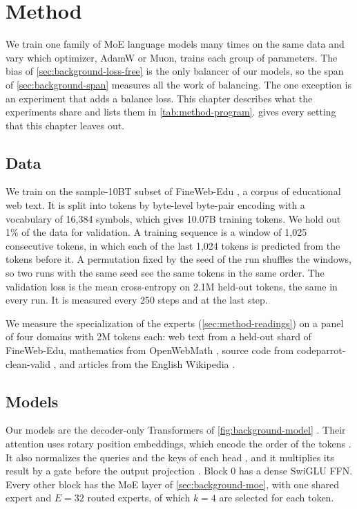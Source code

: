 \chapter{Method}
\label{sec:method}

We train one family of MoE language models many times on the same data and vary which optimizer, AdamW or Muon, trains each group of parameters. The bias of \cref{sec:background-loss-free} is the only balancer of our models, so the span of \cref{sec:background-span} measures all the work of balancing. The one exception is an experiment that adds a balance loss. This chapter describes what the experiments share and lists them in \cref{tab:method-program}.  gives every setting that this chapter leaves out.

\section{Data}
\label{sec:method-data}
We train on the sample-10BT subset of FineWeb-Edu \cite{penedo2024fineweb}, a corpus of educational web text. It is split into tokens by byte-level byte-pair encoding \cite{radford2019language} with a vocabulary of 16,384 symbols, which gives 10.07B training tokens. We hold out 1\% of the data for validation. A training sequence is a window of 1,025 consecutive tokens, in which each of the last 1,024 tokens is predicted from the tokens before it. A permutation fixed by the seed of the run shuffles the windows, so two runs with the same seed see the same tokens in the same order. The validation loss is the mean cross-entropy on 2.1M held-out tokens, the same in every run. It is measured every 250 steps and at the last step.

We measure the specialization of the experts (\cref{sec:method-readings}) on a panel of four domains with 2M tokens each: web text from a held-out shard of FineWeb-Edu, mathematics from OpenWebMath \cite{paster2024openwebmath}, source code from codeparrot-clean-valid \cite{codeparrot2022clean}, and articles from the English Wikipedia \cite{wikimedia2023wikipedia}.

\section{Models}
\label{sec:method-architecture}
Our models are the decoder-only Transformers of \cref{fig:background-model} \cite{vaswani2017attention, radford2019language}. Their attention uses rotary position embeddings, which encode the order of the tokens \cite{su2024roformer}. It also normalizes the queries and the keys of each head \cite{henry2020qknorm, dehghani2023vit22b}, and it multiplies its result by a gate before the output projection \cite{qiu2025gated}. Block 0 has a dense SwiGLU FFN\@. Every other block has the MoE layer of \cref{sec:background-moe}, with one shared expert and $E = 32$ routed experts, of which $k = 4$ are selected for each token.

